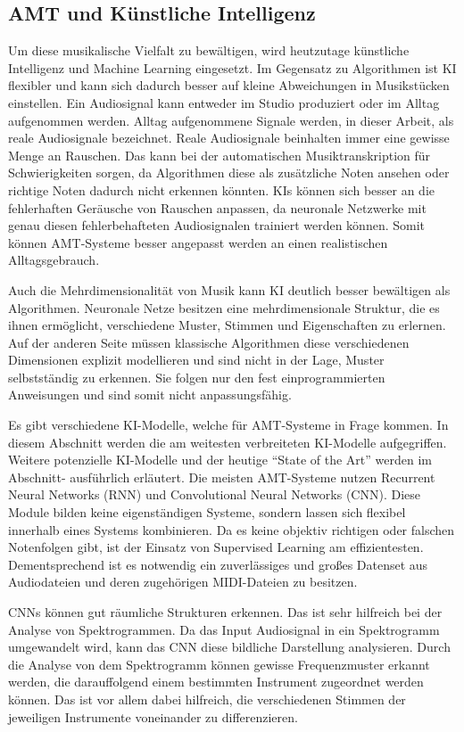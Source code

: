 \subsection{AMT und Künstliche Intelligenz}
Um diese musikalische Vielfalt zu bewältigen, wird heutzutage künstliche Intelligenz und Machine Learning eingesetzt.
Im Gegensatz zu Algorithmen ist KI flexibler und kann sich dadurch besser
auf kleine Abweichungen in Musikstücken einstellen.
Ein Audiosignal kann entweder im Studio produziert oder im Alltag aufgenommen werden.
Alltag aufgenommene Signale werden, in dieser Arbeit, als reale Audiosignale bezeichnet.
Reale Audiosignale beinhalten immer eine gewisse Menge an Rauschen.
Das kann bei der automatischen Musiktranskription für Schwierigkeiten sorgen,
da Algorithmen diese als zusätzliche Noten ansehen oder richtige Noten dadurch nicht erkennen könnten.
KIs können sich besser an die fehlerhaften Geräusche von Rauschen anpassen,
da neuronale Netzwerke mit genau diesen fehlerbehafteten Audiosignalen trainiert werden können.
Somit können AMT-Systeme besser angepasst werden an einen realistischen Alltagsgebrauch.

Auch die Mehrdimensionalität von Musik kann KI deutlich besser bewältigen als Algorithmen.
Neuronale Netze besitzen eine mehrdimensionale Struktur, die es ihnen ermöglicht,
verschiedene Muster, Stimmen und Eigenschaften zu erlernen\cite{graves2007multi}.
Auf der anderen Seite müssen klassische Algorithmen diese verschiedenen Dimensionen
explizit modellieren und sind nicht in der Lage, Muster selbstständig zu erkennen.
Sie folgen nur den fest einprogrammierten Anweisungen und sind somit nicht anpassungsfähig.

Es gibt verschiedene KI-Modelle, welche für AMT-Systeme in Frage kommen.
In diesem Abschnitt werden die am weitesten verbreiteten KI-Modelle aufgegriffen.
Weitere potenzielle KI-Modelle und der heutige
\enquote{State of the Art} werden im Abschnitt- ausführlich erläutert.
Die meisten AMT-Systeme nutzen Recurrent Neural Networks (RNN) und Convolutional Neural Networks (CNN)\cite{Boeck2012}.
Diese Module bilden keine eigenständigen Systeme, sondern lassen sich flexibel innerhalb eines Systems kombinieren.
Da es keine objektiv richtigen oder falschen Notenfolgen gibt, ist der Einsatz von Supervised Learning am effizientesten.
Dementsprechend ist es notwendig ein zuverlässiges und großes Datenset aus Audiodateien und deren zugehörigen MIDI-Dateien zu besitzen.

CNNs können gut räumliche Strukturen erkennen.
Das ist sehr hilfreich bei der Analyse von Spektrogrammen.
Da das Input Audiosignal in ein Spektrogramm umgewandelt wird,
kann das CNN diese bildliche Darstellung analysieren.
Durch die Analyse von dem Spektrogramm können gewisse Frequenzmuster erkannt werden,
die darauffolgend einem bestimmten Instrument zugeordnet werden können.
Das ist vor allem dabei hilfreich, die verschiedenen Stimmen der jeweiligen Instrumente voneinander zu differenzieren\cite{han2016deep}.

